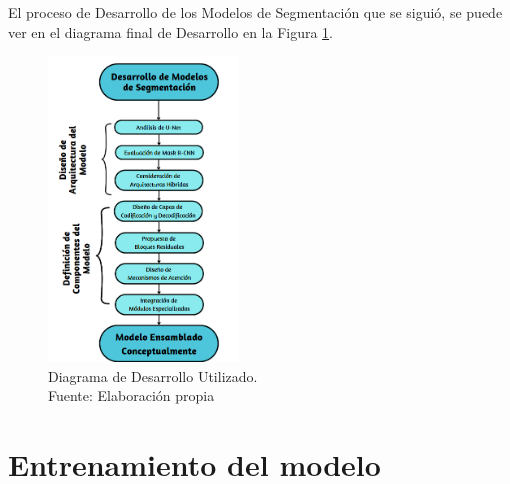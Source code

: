 El proceso de Desarrollo de los Modelos de Segmentación que se siguió, se puede ver en el diagrama final de Desarrollo en la Figura \ref{4:figdesfin}.
\begin{figure}[h]
	\begin{center}
		\includegraphics[width=0.45\textwidth]{4/figures/Diagrama de desarrollo.png}
		\caption[Diagrama de Desarrollo Utilizado]{Diagrama de Desarrollo Utilizado.\\
		Fuente: Elaboración propia}
		\label{4:figdesfin}
	\end{center}
\end{figure}
\newpage

\section{Entrenamiento del modelo}

